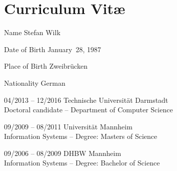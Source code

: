 \chapter{Curriculum Vit\ae}	
	\begin{cv}{}
        \begin{cvlist}{}\label{PersDat}  
        	\item[Name] 	Stefan Wilk 
        	\item[Date of Birth] January~28, 1987
        	\item[Place of Birth] Zweibr\"ucken
        	\item[Nationality] German			
		\end{cvlist}
			
																		   
		\begin{cvlist}{}\label{Stud}
			\item[04/2013 -- 12/2016] Technische Universit\"at Darmstadt \\
				Doctoral candidate -- Department of Computer Science
			\item[09/2009 -- 08/2011] Universit\"at Mannheim \\
							Information Systems --
							Degree: Masters of Science	
			\item[09/2006 -- 08/2009] DHBW Mannheim \\
									Information Systems --
									Degree: Bachelor of Science	
				


\end{cvlist}
\end{cv}
